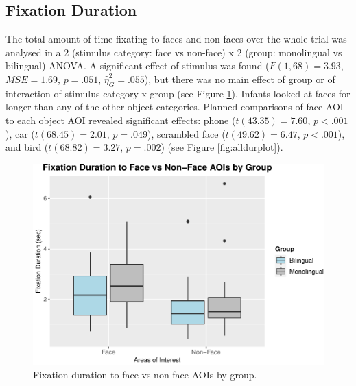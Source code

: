 \documentclass[english,man,floatsintext]{apa6}
\begin{document}
\hypertarget{fixation-duration}{%
\subsection{Fixation Duration}\label{fixation-duration}}

The total amount of time fixating to faces and non-faces over the whole trial was analysed in a 2 (stimulus category: face vs non-face) x 2 (group: monolingual vs bilingual) ANOVA. A significant effect of stimulus was found (\(F(1, 68) = 3.93\), \(\mathit{MSE} = 1.69\), \(p = .051\), \(\hat{\eta}^2_G = .055\)), but there was no main effect of group or of interaction of stimulus category x group (see Figure \ref{fig:durface}). Infants looked at faces for longer than any of the other object categories. Planned comparisons of face AOI to each object AOI revealed significant effects: phone (\(t(43.35) = 7.60\), \(p < .001\)), car (\(t(68.45) = 2.01\), \(p = .049\)), scrambled face (\(t(49.62) = 6.47\), \(p < .001\)), and bird (\(t(68.82) = 3.27\), \(p = .002\)) (see Figure \ref{fig:alldurplot}).

\begin{figure}
\includegraphics{Effects_of_early_language_experience_on_infants_files/figure-latex/durface-1} \caption{Fixation duration to face vs non-face AOIs by group.}\label{fig:durface}
\end{figure}
\end{document}
